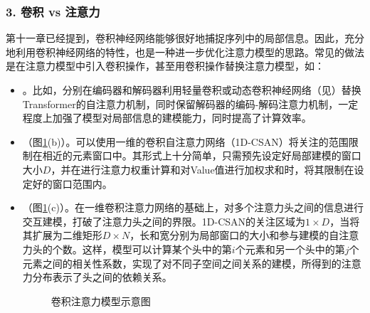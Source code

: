 \subsubsection{3. 卷积 vs 注意力}

\parinterval 第十一章已经提到，卷积神经网络能够很好地捕捉序列中的局部信息。因此，充分地利用卷积神经网络的特性，也是一种进一步优化注意力模型的思路。常见的做法是在注意力模型中引入卷积操作，甚至用卷积操作替换注意力模型，如：

\begin{itemize}
\vspace{0.5em}
\item {\small{}}。比如，分别在编码器和解码器利用轻量卷积或动态卷积神经网络（见{\chapternine}）替换Transformer的自注意力机制，同时保留解码器的编码-解码注意力机制，一定程度上加强了模型对局部信息的建模能力，同时提高了计算效率。
\vspace{0.5em}
\item {\small{}}（图\ref{fig:15-5}(b)）。可以使用一维的卷积自注意力网络（1D-CSAN）将关注的范围限制在相近的元素窗口中。其形式上十分简单，只需预先设定好局部建模的窗口大小$D$，并在进行注意力权重计算和对Value值进行加权求和时，将其限制在设定好的窗口范围内。
\vspace{0.5em}
\item {\small{}}（图\ref{fig:15-5}(c)）。在一维卷积注意力网络的基础上，对多个注意力头之间的信息进行交互建模，打破了注意力头之间的界限。1D-CSAN的关注区域为$1\times D$，当将其扩展为二维矩形$D \times N$，长和宽分别为局部窗口的大小和参与建模的自注意力头的个数。这样，模型可以计算某个头中的第$i$个元素和另一个头中的第$j$个元素之间的相关性系数，实现了对不同子空间之间关系的建模，所得到的注意力分布表示了头之间的依赖关系。

\begin{figure}[htp]
\centering

\caption{卷积注意力模型示意图}
\label{fig:15-5}
\end{figure}
\end{itemize}


